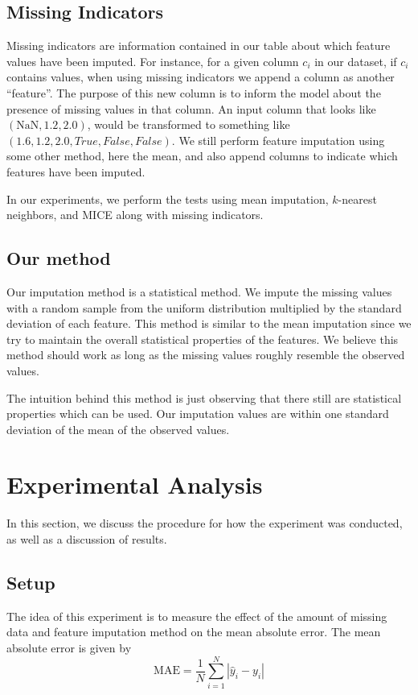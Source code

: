 \documentclass[12pt]{article}
\begin{document}
\subsection{Missing Indicators}
Missing indicators are information contained in our table about which feature 
values have been imputed.
For instance, for a given column $c_i$ in our dataset, if $c_i$ contains 
values, when using missing indicators we append a column as another ``feature''.
The purpose of this new column is to inform the model about the presence
of missing values in that column.
An input column  that looks like $(\textrm{NaN}, 1.2, 2.0)$, would be transformed to 
something like $(1.6, 1.2, 2.0, True, False, False)$.
We still perform feature imputation using some other method, here the mean,
and also append columns to indicate which features have been imputed.

In our experiments, we perform the tests using mean imputation, $k$-nearest 
neighbors, and MICE along with missing indicators.

\subsection{Our method}
Our imputation method is a statistical method.
We impute the missing values with a random sample from the uniform 
distribution multiplied by the standard deviation of each feature.
This method is similar to the mean imputation since we try to 
maintain the overall statistical properties of the features.
We believe this method should work as long as the missing values
roughly resemble the observed values.

The intuition behind this method is just observing that there still are 
statistical properties which can be used. 
Our imputation values are within one standard deviation of the mean
of the observed values.

\section{Experimental Analysis}
In this section, we discuss the procedure for how the experiment was conducted, 
as well as a discussion of results.
\subsection{Setup}
The idea of this experiment is to measure the effect of the amount of missing data 
and feature imputation method on the mean absolute error.
The mean absolute error is given by 
\[\textrm{MAE} = \frac{1}{N}\sum_{i=1}^{N}|\hat{y}_i - y_i|\]
\end{document}
